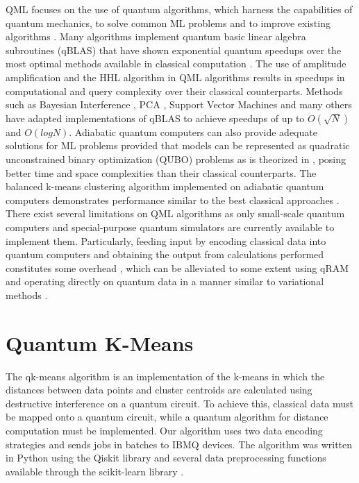 \documentclass[conference]{IEEEtran}
\begin{document}
QML focuses on the use of quantum algorithms, which harness the capabilities of quantum mechanics, to solve common ML problems and to improve existing algorithms \cite{Schuld_2014,adachi2015application}. Many algorithms implement quantum basic linear algebra subroutines (qBLAS) that have shown exponential quantum speedups over the most optimal methods available in classical computation \cite{Biamonte2017}. The use of amplitude amplification \cite{Brassard_2002} and the HHL \cite{PhysRevLett.103.150502} algorithm in QML algorithms results in speedups in computational and query complexity over their classical counterparts. Methods such as Bayesian Interference \cite{PhysRevA.89.062315}, PCA \cite{Lloyd2014}, Support Vector Machines \cite{PhysRevLett.113.130503} and many others \cite{wiebe2016quantum}\cite{PhysRevLett.109.050505}\cite{PhysRevLett.117.130501} have adapted implementations of qBLAS to achieve speedups of up to $O(\sqrt{N})$ and $O(logN)$. Adiabatic quantum computers can also provide adequate solutions for ML problems provided that models can be represented as quadratic unconstrained binary optimization (QUBO) problems as is theorized in \cite{Date2021}, posing better time and space complexities than their classical counterparts. The balanced k-means clustering algorithm implemented on adiabatic quantum computers demonstrates performance similar to the best classical approaches \cite{arthur2020balanced}.
There exist several limitations on QML algorithms as only small-scale quantum computers and special-purpose quantum simulators are currently available to implement them. Particularly, feeding input by encoding classical data into quantum computers and obtaining the output from calculations performed constitutes some overhead \cite{Aaronson2015}, which can be alleviated to some extent using qRAM and operating directly on quantum data in a manner similar to variational methods \cite{Peruzzo2014}.

\section{Quantum K-Means}

The qk-means algorithm is an implementation of the k-means in which the distances between data points and cluster centroids are calculated using destructive interference on a quantum circuit. To achieve this, classical data must be mapped onto a quantum circuit, while a quantum algorithm for distance computation must be implemented. Our algorithm uses two data encoding strategies and sends jobs in batches to IBMQ devices. The algorithm was written in Python using the Qiskit library and several data preprocessing functions available through the scikit-learn library \cite{scikit-learn}. 
\end{document}
